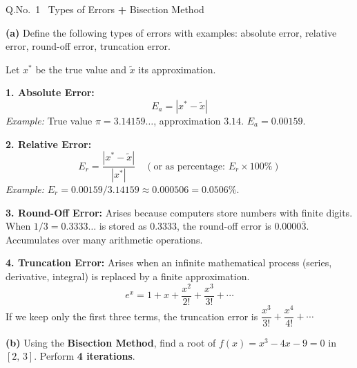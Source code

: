 \documentclass[12pt]{article}
\begin{document}
\newpage

\begin{qbox}{Q.No.\ 1 \textemdash\ Types of Errors \textbf{+} Bisection Method}
\end{qbox}

\medskip
\textbf{(a)} Define the following types of errors with examples: absolute error, relative error, round-off error, truncation error.

\begin{ansbox}
Let $x^*$ be the true value and $\tilde{x}$ its approximation.

\medskip
\textbf{1. Absolute Error:}
\[
  E_a = |x^* - \tilde{x}|
\]
\textit{Example:} True value $\pi = 3.14159\ldots$, approximation $3.14$. $E_a = 0.00159$.

\medskip
\textbf{2. Relative Error:}
\[
  E_r = \frac{|x^* - \tilde{x}|}{|x^*|} \quad(\text{or as percentage: } E_r\times100\%)
\]
\textit{Example:} $E_r = 0.00159/3.14159 \approx 0.000506 = 0.0506\%$.

\medskip
\textbf{3. Round-Off Error:}
Arises because computers store numbers with finite digits. When $1/3 = 0.3333\ldots$ is stored as $0.3333$, the round-off error is $0.0000\overline{3}$. Accumulates over many arithmetic operations.

\medskip
\textbf{4. Truncation Error:}
Arises when an infinite mathematical process (series, derivative, integral) is replaced by a finite approximation.
\[
  e^x = 1 + x + \frac{x^2}{2!} + \frac{x^3}{3!} + \cdots
\]
If we keep only the first three terms, the truncation error is $\dfrac{x^3}{3!}+\dfrac{x^4}{4!}+\cdots$
\end{ansbox}

\medskip
\textbf{(b)} Using the \textbf{Bisection Method}, find a root of $f(x) = x^3 - 4x - 9 = 0$ in $[2,\,3]$. Perform \textbf{4 iterations}.
\end{document}
